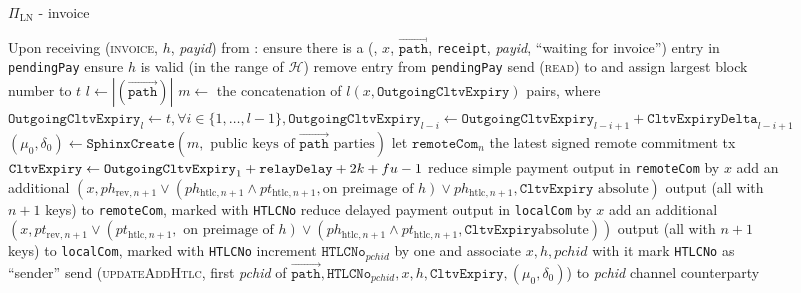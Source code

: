\begin{figure}[H]
\begin{protocolbox}{$\Pi_{\mathrm{LN}}$ - invoice}
\begin{algorithmic}[1]
        \State Upon receiving (\textsc{invoice}, $h$, \textit{payid}) from \bob:
        \Indent
          \State ensure there is a (\bob, $x$, $\overrightarrow{\mathtt{path}}$,
          \texttt{receipt}, \textit{payid}, ``waiting for invoice'') entry in
          \texttt{pendingPay}
          \State ensure $h$ is valid (in the range of $\mathcal{H}$)
          \State remove entry from \texttt{pendingPay}
          \State send (\textsc{read}) to \ledger{} and assign largest block
          number to $t$
          \State $l \gets |\left(\overrightarrow{\mathtt{path}}\right)|$
          \State $m \gets$ the concatenation of $l \left(x,
          \mathtt{OutgoingCltvExpiry}\right)$ pairs, where
          $\mathtt{OutgoingCltvExpiry}_l \gets t, \forall i \in \{1, \dots, l -
          1\}, \mathtt{OutgoingCltvExpiry}_{l - i} \gets
          \mathtt{OutgoingCltvExpiry}_{l - i + 1} + \mathtt{CltvExpiryDelta}_{l
          - i + 1}$
          \label{alg:protocol:pay:invoice:cltv}
          \State $\left(\mu_0, \delta_0\right) \gets
          \mathtt{SphinxCreate}\left(m, \text{ public keys of }
          \overrightarrow{\mathtt{path}} \text{ parties}\right)$
          \State let $\mathtt{remoteCom}_n$ the latest signed remote commitment
          tx
          \State $\mathtt{CltvExpiry} \gets \mathtt{OutgoingCltvExpiry}_1 +
          \mathtt{relayDelay} + 2k + fu{} - 1$
          \State reduce simple payment output in \texttt{remoteCom} by $x$
          \State add an additional $\left(x, ph_{\mathrm{rev}, n+1} \vee
          \left(ph_{\mathrm{htlc}, n+1} \wedge pt_{\mathrm{htlc}, n+1}, \text{
          on preimage}\right.\right.$ $\left.\left.\text{of } h\right) \vee
          ph_{\mathrm{htlc}, n+1}, \mathtt{CltvExpiry} \text{ absolute}\right)$
          output (all with $n+1$ keys) to \texttt{remoteCom}, marked with
          \texttt{HTLCNo}
          \State reduce delayed payment output in \texttt{localCom} by $x$
          \State add an additional $\left(x, pt_{\mathrm{rev}, n+1} \vee
          \left(pt_{\mathrm{htlc}, n+1}, \text{ on preimage}\right.\right.$
          $\left.\left.\text{of } h\right) \vee \left(ph_{\mathrm{htlc}, n+1}
          \wedge pt_{\mathrm{htlc}, n+1}, \mathtt{CltvExpiry} \text{
          absolute}\right)\right)$ output (all with $n+1$ keys) to
          \texttt{localCom}, marked with \texttt{HTLCNo}
          \State increment $\mathtt{HTLCNo}_{\mathit{pchid}}$ by one and
          associate $x, h, \mathit{pchid}$ with it
          \State mark \texttt{HTLCNo} as ``sender''
          \State send (\textsc{updateAddHtlc}, first \textit{pchid} of
          $\overrightarrow{\mathtt{path}}, \mathtt{HTLCNo}_{\mathit{pchid}}, x,
          h, \mathtt{CltvExpiry}, \left(\mu_0, \delta_0\right)$) to
          \textit{pchid} channel counterparty
        \EndIndent
      \end{algorithmic}
    \end{protocolbox}
    \caption{}
    \label{alg:protocol:pay:invoice}
  \end{figure}

